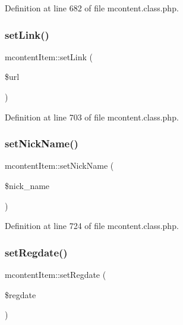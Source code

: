 Definition at line 682 of file mcontent.\+class.\+php.

\mbox{\label{classmcontentItem_a6c192aee58d7bca3d8933d387309b2ab}} 
\subsubsection{\texorpdfstring{set\+Link()}{setLink()}}
{\footnotesize\ttfamily mcontent\+Item\+::set\+Link (\begin{DoxyParamCaption}\item[{}]{\$url }\end{DoxyParamCaption})}



Definition at line 703 of file mcontent.\+class.\+php.

\mbox{\label{classmcontentItem_a4b702963538643aac56d9a3312a06bee}} 
\subsubsection{\texorpdfstring{set\+Nick\+Name()}{setNickName()}}
{\footnotesize\ttfamily mcontent\+Item\+::set\+Nick\+Name (\begin{DoxyParamCaption}\item[{}]{\$nick\+\_\+name }\end{DoxyParamCaption})}



Definition at line 724 of file mcontent.\+class.\+php.

\mbox{\label{classmcontentItem_aeb646f2283bfb0a13b7d9f544058f962}} 
\subsubsection{\texorpdfstring{set\+Regdate()}{setRegdate()}}
{\footnotesize\ttfamily mcontent\+Item\+::set\+Regdate (\begin{DoxyParamCaption}\item[{}]{\$regdate }\end{DoxyParamCaption})}



